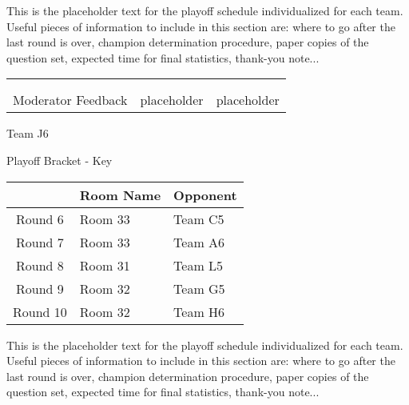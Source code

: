 \documentclass{article}%
\begin{document}
\vspace*{30pt}%
\linebreak%
This is the placeholder text for the playoff schedule individualized for each team. Useful pieces of information to include in this section are: where to go after the last round is over, champion determination procedure, paper copies of the question set, expected time for final statistics, thank{-}you note...%
\vspace*{30pt}%
\newline%
%
\begin{tabularx}{\textwidth}{YYY}%
  &  &  \\%
\\%
Moderator Feedback&placeholder&placeholder\\%
\end{tabularx}%
\newpage%
\begin{center}%
\begin{Huge}%
Team J6%
\end{Huge}%
\vspace*{12pt}%
\linebreak%
\begin{Large}%
Playoff Bracket {-} Key%
\end{Large}%
\end{center}%
\vspace*{4pt}%
%
\begin{tabularx}{\textwidth}{|c|Y|Y|}%
\hline%
&Room Name&Opponent\\%
\hline%
Round 6&Room 33&Team C5\\%
Round 7&Room 33&Team A6\\%
Round 8&Room 31&Team L5\\%
Round 9&Room 32&Team G5\\%
Round 10&Room 32&Team H6\\%
\hline%
\end{tabularx}%
\vspace*{30pt}%
\linebreak%
This is the placeholder text for the playoff schedule individualized for each team. Useful pieces of information to include in this section are: where to go after the last round is over, champion determination procedure, paper copies of the question set, expected time for final statistics, thank{-}you note...%
\vspace*{30pt}%
\end{document}

